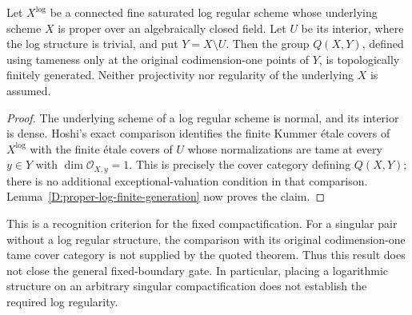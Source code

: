 \begin{proposition}
\label{D:log-regular-boundary}
Let $X^{\log}$ be a connected fine saturated log regular scheme
whose underlying scheme $X$ is proper over an algebraically
closed field.  Let $U$ be its interior, where the log structure
is trivial, and put $Y=X\setminus U$.  Then the group $Q(X,Y)$,
defined using tameness only at the original codimension-one
points of $Y$, is topologically finitely generated.
Neither projectivity nor regularity of the underlying $X$ is
assumed.
\end{proposition}
\begin{proof}
The underlying scheme of a log regular scheme is normal, and
its interior is dense.  Hoshi's exact comparison
\cite[Proposition A.10, pp. 57--58]{Hoshi2006B} identifies the
finite Kummer \'etale covers of $X^{\log}$ with the finite
\'etale covers of $U$ whose normalizations are tame at every
$y\in Y$ with $\dim\mathcal O_{X,y}=1$.  This is precisely the
cover category defining $Q(X,Y)$; there is no additional
exceptional-valuation condition in that comparison.
Lemma~\ref{D:proper-log-finite-generation} now proves the claim.
\end{proof}

\begin{remark}
This is a recognition criterion for the fixed compactification.
For a singular pair without a log regular structure, the
comparison with its original codimension-one tame cover category
is not supplied by the quoted theorem.  Thus this result does
not close the general fixed-boundary gate.  In particular,
placing a logarithmic structure on an arbitrary singular
compactification does not establish the required log regularity.
\end{remark}

